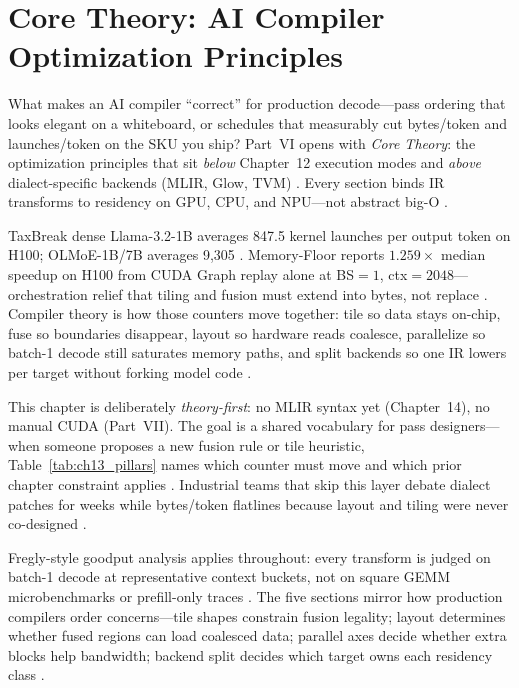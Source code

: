 \chapter{Core Theory: AI Compiler Optimization Principles}
\label{chap:ch13}

What makes an AI compiler ``correct'' for production decode---pass ordering that looks elegant on a whiteboard, or schedules that measurably cut bytes/token and launches/token on the SKU you ship? Part~VI opens with \emph{Core Theory}: the optimization principles that sit \emph{below} Chapter~12 execution modes and \emph{above} dialect-specific backends (MLIR, Glow, TVM) \citep{chen2020compilerbasedhardw,yirage2026,taxbreak2026}. Every section binds IR transforms to residency on GPU, CPU, and NPU---not abstract big-O \citep{patel2025llminference,amd2024xdna,amd2024aie,dlbook}.

TaxBreak dense Llama-3.2-1B averages 847.5 kernel launches per output token on H100; OLMoE-1B/7B averages 9,305 \citep{taxbreak2026}. Memory-Floor reports $1.259\times$ median speedup on H100 from CUDA Graph replay alone at BS${=}1$, ctx${=}2048$---orchestration relief that tiling and fusion must extend into bytes, not replace \citep{memoryfloor2026,nvidia2024cudagraphs}. Compiler theory is how those counters move together: tile so data stays on-chip, fuse so boundaries disappear, layout so hardware reads coalesce, parallelize so batch-1 decode still saturates memory paths, and split backends so one IR lowers per target without forking model code \citep{yirage2026,chen2020compilerbasedhardw,semianalysis2024tma,dao2022flashattention,kwon2023vllm,liu2024deepseekv3,dao2023flashdecoding}.

This chapter is deliberately \emph{theory-first}: no MLIR syntax yet (Chapter~14), no manual CUDA (Part~VII). The goal is a shared vocabulary for pass designers---when someone proposes a new fusion rule or tile heuristic, Table~\ref{tab:ch13_pillars} names which counter must move and which prior chapter constraint applies \citep{yirage2026,chen2020compilerbasedhardw,patel2025llminference}. Industrial teams that skip this layer debate dialect patches for weeks while bytes/token flatlines because layout and tiling were never co-designed \citep{memoryfloor2026,taxbreak2026,kwon2023vllm}.

Fregly-style goodput analysis applies throughout: every transform is judged on batch-1 decode at representative context buckets, not on square GEMM microbenchmarks or prefill-only traces \citep{patel2025llminference,memoryfloor2026,taxbreak2026}. The five sections mirror how production compilers order concerns---tile shapes constrain fusion legality; layout determines whether fused regions can load coalesced data; parallel axes decide whether extra blocks help bandwidth; backend split decides which target owns each residency class \citep{yirage2026,chen2020compilerbasedhardw,amd2024xdna,amd2024aie,dlbook}.

